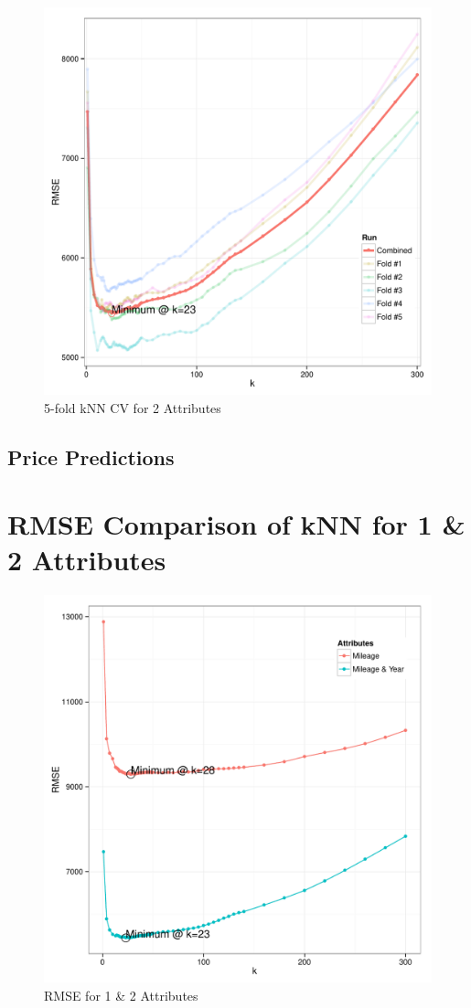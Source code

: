 \documentclass[11pt, fleqn]{article}
\begin{document}
\begin{figure}[!htb]
  \centering
  \includegraphics[scale=.5]{2p_cv_k.pdf}
  \caption{5-fold kNN CV for 2 Attributes}
  \label{fig:2p_k}
\end{figure}

\subsection{Price Predictions}


\section{RMSE Comparison of kNN for 1 \& 2 Attributes}
\begin{figure}[!htb]
  \centering
  \includegraphics[scale=.5]{1p_2p_cv_compare.pdf}
  \caption{RMSE for 1 \& 2 Attributes}
  \label{fig:p_compare}
\end{figure}
\end{document}
